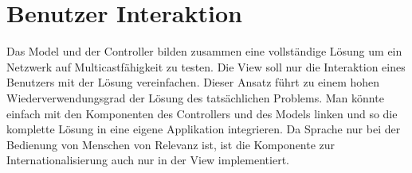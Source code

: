 \section{Benutzer Interaktion}
\label{sec:7:user}
Das Model und der Controller bilden zusammen eine vollständige Lösung um ein
Netzwerk auf Multicastfähigkeit zu testen. Die View soll nur die Interaktion eines Benutzers mit der Lösung vereinfachen. Dieser Ansatz führt zu einem
hohen Wiederverwendungsgrad der Lösung des tatsächlichen Problems. Man könnte einfach mit den Komponenten des
Controllers und des Models linken und so die komplette Lösung in eine eigene Applikation integrieren. 
Da Sprache nur bei der Bedienung von Menschen von Relevanz ist, ist die Komponente zur Internationalisierung 
auch nur in der View implementiert.

